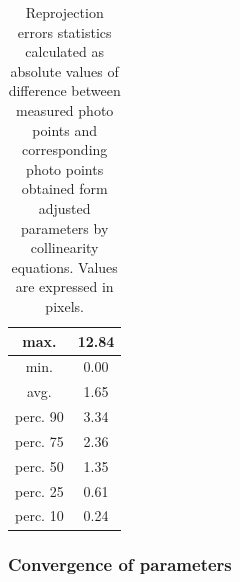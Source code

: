 \documentclass[a4paper,12pt]{article}
\begin{document}
\begin{center}
\footnotesize
{}
\begin{longtable}{| c | c |}
\caption{Reprojection errors statistics calculated 
as absolute values of difference between 
measured photo points and  corresponding photo points 
obtained form adjusted parameters by collinearity equations.
Values are expressed in pixels.}
\label{table:rep_e_results}
\\ \hline
max. & 12.84 \\ \hline 
min. & 0.00 \\ \hline 
avg.  & 1.65 \\ \hline 
perc. 90  & 3.34 \\ \hline 
perc. 75  & 2.36 \\ \hline 
perc. 50  & 1.35 \\ \hline 
perc. 25  & 0.61 \\ \hline 
perc. 10  & 0.24 \\ \hline 
\hline 
\end{longtable}
\end{center}

\subsubsection{Convergence of parameters}
\end{document}
